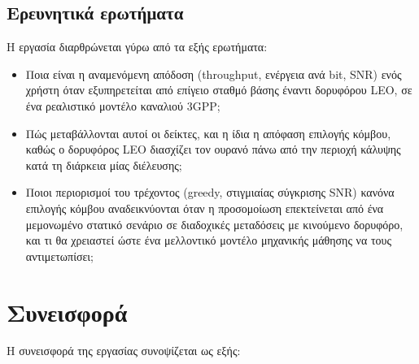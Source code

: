 \subsection{Ερευνητικά ερωτήματα}
\label{subsec:intro-questions}

Η εργασία διαρθρώνεται γύρω από τα εξής ερωτήματα:

\begin{itemize}
  \item[\textbf{Ε1.}] Ποια είναι η αναμενόμενη απόδοση (throughput, ενέργεια
    ανά bit, SNR) ενός χρήστη όταν εξυπηρετείται από επίγειο σταθμό βάσης
    έναντι δορυφόρου LEO, σε ένα ρεαλιστικό μοντέλο καναλιού 3GPP;
  \item[\textbf{Ε2.}] Πώς μεταβάλλονται αυτοί οι δείκτες, και η ίδια η
    απόφαση επιλογής κόμβου, καθώς ο δορυφόρος LEO διασχίζει τον ουρανό
    πάνω από την περιοχή κάλυψης κατά τη διάρκεια μίας διέλευσης;
  \item[\textbf{Ε3.}] Ποιοι περιορισμοί του τρέχοντος (greedy, στιγμιαίας
    σύγκρισης SNR) κανόνα επιλογής κόμβου αναδεικνύονται όταν η
    προσομοίωση επεκτείνεται από ένα μεμονωμένο στατικό σενάριο σε
    διαδοχικές μεταδόσεις με κινούμενο δορυφόρο, και τι θα χρειαστεί
    ώστε ένα μελλοντικό μοντέλο μηχανικής μάθησης να τους αντιμετωπίσει;
\end{itemize}

\section{Συνεισφορά}
\label{sec:intro-contribution}

Η συνεισφορά της εργασίας συνοψίζεται ως εξής:

